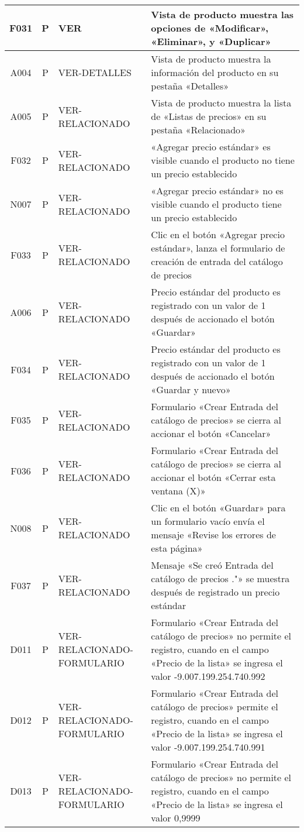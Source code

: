 \begin{landscape}
{\begin{longtable}[htb]{|c|c|p{5.0cm}|p{14.0cm}|}
F031 & P & VER & Vista de producto muestra las opciones de «Modificar», «Eliminar», y «Duplicar» \\ \hline
A004 & P & VER-DETALLES & Vista de producto muestra la información del producto en su pestaña «Detalles» \\ \hline
A005 & P & VER-RELACIONADO & Vista de producto muestra la lista de «Listas de precios» en su pestaña «Relacionado» \\ \hline
F032 & P & VER-RELACIONADO & «Agregar precio estándar» es visible cuando el producto no tiene un precio establecido \\ \hline
N007 & P & VER-RELACIONADO & «Agregar precio estándar» no es visible cuando el producto tiene un precio establecido \\ \hline
F033 & P & VER-RELACIONADO & Clic en el botón «Agregar precio estándar», lanza el formulario de creación de entrada del catálogo de precios \\ \hline
A006 & P & VER-RELACIONADO & Precio estándar del producto es registrado con un valor de 1 después de accionado el botón «Guardar» \\ \hline
F034 & P & VER-RELACIONADO & Precio estándar del producto es registrado con un valor de 1 después de accionado el botón «Guardar y nuevo» \\ \hline
F035 & P & VER-RELACIONADO & Formulario «Crear Entrada del catálogo de precios» se cierra al accionar el botón «Cancelar» \\ \hline
F036 & P & VER-RELACIONADO & Formulario «Crear Entrada del catálogo de precios» se cierra al accionar el botón «Cerrar esta ventana (X)» \\ \hline
N008 & P & VER-RELACIONADO & Clic en el botón «Guardar» para un formulario vacío envía el mensaje «Revise los errores de esta página» \\ \hline
F037 & P & VER-RELACIONADO & Mensaje «Se creó Entrada del catálogo de precios ."» se muestra después de registrado un precio estándar \\ \hline
D011 & P & VER-RELACIONADO-FORMULARIO & Formulario «Crear Entrada del catálogo de precios» no permite el registro, cuando en el campo «Precio de la lista» se ingresa el valor -9.007.199.254.740.992 \\ \hline
D012 & P & VER-RELACIONADO-FORMULARIO & Formulario «Crear Entrada del catálogo de precios» permite el registro, cuando en el campo «Precio de la lista» se ingresa el valor -9.007.199.254.740.991 \\ \hline
D013 & P & VER-RELACIONADO-FORMULARIO & Formulario «Crear Entrada del catálogo de precios» no permite el registro, cuando en el campo «Precio de la lista» se ingresa el valor 0,9999 \\ \hline

\end{longtable}}
\end{landscape}
